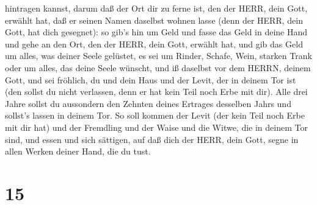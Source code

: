 hintragen kannst, darum daß der Ort dir zu ferne ist, den der HERR, dein
Gott, erwählt hat, daß er seinen Namen daselbst wohnen lasse (denn der
HERR, dein Gott, hat dich gesegnet):  so gib's hin um Geld
und fasse das Geld in deine Hand und gehe an den Ort, den der HERR, dein
Gott, erwählt hat,  und gib das Geld um alles, was deiner
Seele gelüstet, es sei um Rinder, Schafe, Wein, starken Trank oder um
alles, das deine Seele wünscht, und iß daselbst vor dem HERRN, deinem
Gott, und sei fröhlich, du und dein Haus  und der Levit,
der in deinem Tor ist (den sollst du nicht verlassen, denn er hat kein
Teil noch Erbe mit dir).  Alle drei Jahre sollst du
aussondern den Zehnten deines Ertrages desselben Jahrs und sollst's
lassen in deinem Tor.  So soll kommen der Levit (der kein
Teil noch Erbe mit dir hat) und der Fremdling und der Waise und die
Witwe, die in deinem Tor sind, und essen und sich sättigen, auf daß dich
der HERR, dein Gott, segne in allen Werken deiner Hand, die du tust.

\hypertarget{section-14}{%
\section{15}\label{section-14}}

